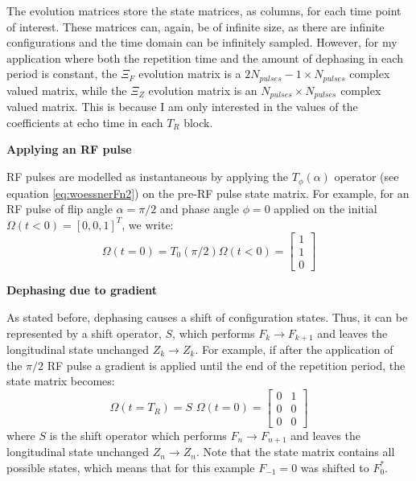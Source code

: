 \hfill

The evolution matrices store the state matrices, as columns, for each time point of interest.
These matrices can, again, be of infinite size, as there are infinite configurations and the time domain can be infinitely sampled.
However, for my application where both the repetition time and the amount of dephasing in each period is constant, the $\Xi_F$ evolution matrix is a $2N_{pulses}-1 \times N_{pulses}$ complex valued matrix, while the $\Xi_Z$ evolution matrix is an $N_{pulses} \times N_{pulses}$ complex valued matrix.
This is because I am only interested in the values of the coefficients at echo time in each $T_R$ block.

\hfill

\textbf{Applying an RF pulse}

RF pulses are modelled as instantaneous by applying the $T_{\phi}(\alpha)$ operator (see equation \ref{eq:woessnerFn2}) on the pre-RF pulse state matrix.
For example, for an RF pulse of flip angle $\alpha = \pi/2$ and phase angle $\phi = 0$ applied on the initial $\Omega (t < 0) = [0, 0, 1]^T$, we write:
\begin{equation}
    \Omega (t = 0) = T_0(\pi/2) \Omega (t < 0) = 
    \begin{bmatrix} 
        1 \\
        1 \\
        0
    \end{bmatrix}
\end{equation}

\hfill

\textbf{Dephasing due to gradient}

As stated before, dephasing causes a shift of configuration states.
Thus, it can be represented by a shift operator, $S$, which performs $F_k \rightarrow F_{k+1}$ and leaves the longitudinal state unchanged $Z_k \rightarrow Z_k$. 
For example, if after the application of the $\pi/2$ RF pulse a gradient is applied until the end of the repetition period, the state matrix becomes:
\begin{equation}
    \Omega (t = T_R) = S \, \, \Omega (t = 0) = 
    \begin{bmatrix} 
        0 & 1\\
        0 & 0\\
        0 & 0
    \end{bmatrix}
\end{equation}
where $S$ is the shift operator which performs $F_n \rightarrow F_{n+1}$ and leaves the longitudinal state unchanged $Z_n \rightarrow Z_n$. 
Note that the state matrix contains all possible states, which means that for this example $F_{-1} = 0$ was shifted to $F_0^*$.

